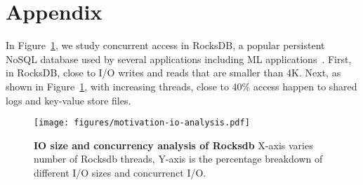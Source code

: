 \newpage
\section{Appendix}
\label{appendix}
In Figure~\ref{fig:motivation-io-analysis}, we study concurrent access in 
RocksDB, a popular persistent NoSQL database used by several applications
including ML applications~\cite{TF:LevelDB}. First, in RocksDB, close 
to  I/O writes and reads that are smaller than 4K. Next, 
as shown in Figure~\ref{fig:motivation-io-analysis}, with increasing threads, 
close to 40\% access happen to shared logs and key-value store files.

\begin{figure}[t]
\texttt{[image: figures/motivation-io-analysis.pdf]}
 \vspace{-0.2in}
  \caption{{\bf IO size and concurrency analysis of Rocksdb}
  \small{X-axis varies number of Rocksdb threads, Y-axis is the percentage
breakdown of different I/O sizes and concurrenct I/O.}}
\label{fig:motivation-io-analysis}
\end{figure}
